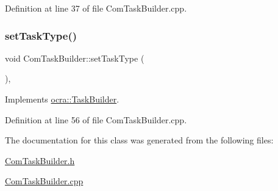 Definition at line 37 of file Com\+Task\+Builder.\+cpp.

\hypertarget{classocra_1_1ComTaskBuilder_af9cfac995156297324ccbee1900f891c}{}\label{classocra_1_1ComTaskBuilder_af9cfac995156297324ccbee1900f891c} 
\subsubsection{\texorpdfstring{set\+Task\+Type()}{setTaskType()}}
{\footnotesize\ttfamily void Com\+Task\+Builder\+::set\+Task\+Type (\begin{DoxyParamCaption}{ }\end{DoxyParamCaption})\hspace{0.3cm}{\ttfamily [protected]}, {\ttfamily [virtual]}}



Implements \hyperlink{classocra_1_1TaskBuilder_a1a979fc495be6dc30483aa8fd0ff2650}{ocra\+::\+Task\+Builder}.



Definition at line 56 of file Com\+Task\+Builder.\+cpp.



The documentation for this class was generated from the following files\+:\begin{DoxyCompactItemize}
\item 
\hyperlink{ComTaskBuilder_8h}{Com\+Task\+Builder.\+h}\item 
\hyperlink{ComTaskBuilder_8cpp}{Com\+Task\+Builder.\+cpp}\end{DoxyCompactItemize}
